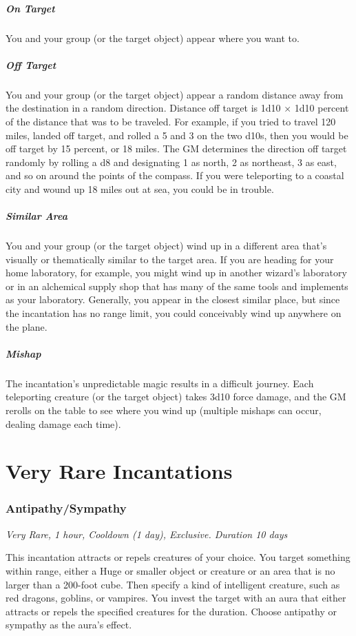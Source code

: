 \subparagraph*{On Target} You and your group (or the target object) appear where you want to.

\subparagraph*{Off Target} You and your group (or the target object) appear a random distance away from the destination in a random direction. Distance off target is 1d10 × 1d10 percent of the distance that was to be traveled. For example, if you tried to travel 120 miles, landed off target, and rolled a 5 and 3 on the two d10s, then you would be off target by 15 percent, or 18 miles. The GM determines the direction off target randomly by rolling a d8 and designating 1 as north, 2 as northeast, 3 as east, and so on around the points of the compass. If you were teleporting to a coastal city and wound up 18 miles out at sea, you could be in trouble.

\subparagraph*{Similar Area} You and your group (or the target object) wind up in a different area that's visually or thematically similar to the target area. If you are heading for your home laboratory, for example, you might wind up in another wizard's laboratory or in an alchemical supply shop that has many of the same tools and implements as your laboratory. Generally, you appear in the closest similar place, but since the incantation has no range limit, you could conceivably wind up anywhere on the plane.

\subparagraph*{Mishap} The incantation's unpredictable magic results in a difficult journey. Each teleporting creature (or the target object) takes 3d10 force damage, and the GM rerolls on the table to see where you wind up (multiple mishaps can occur, dealing damage each time).

\section{Very Rare Incantations}

\subsubsection{Antipathy/Sympathy}
\textit{Very Rare, 1 hour, Cooldown (1 day), Exclusive. Duration 10 days}

This incantation attracts or repels creatures of your choice. You target something within range, either a Huge or smaller object or creature or an area that is no larger than a 200-foot cube. Then specify a kind of intelligent creature, such as red dragons, goblins, or vampires. You invest the target with an aura that either attracts or repels the specified creatures for the duration. Choose antipathy or sympathy as the aura's effect.


